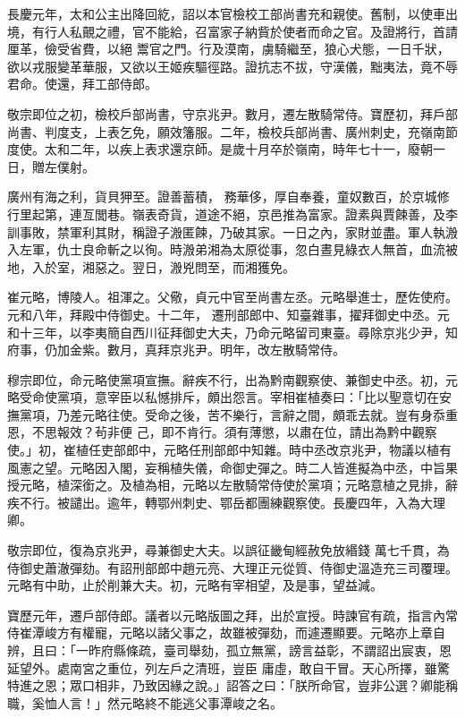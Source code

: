 \begin{pinyinscope}
 長慶元年，太和公主出降回紇，詔以本官檢校工部尚書充和親使。舊制，以使車出境，有行人私覿之禮，官不能給，召富家子納貲於使者而命之官。及證將行，首請厘革，儉受省費，以絕
 鬻官之門。行及漠南，虜騎繼至，狼心犬態，一日千狀，欲以戎服變革華服，又欲以王姬疾驅徑路。證抗志不拔，守漢儀，黜夷法，竟不辱君命。使還，拜工部侍郎。



 敬宗即位之初，檢校戶部尚書，守京兆尹。數月，遷左散騎常侍。寶歷初，拜戶部尚書、判度支，上表乞免，願效籓服。二年，檢校兵部尚書、廣州刺史，充嶺南節度使。太和二年，以疾上表求還京師。是歲十月卒於嶺南，時年七十一，廢朝一日，贈左僕射。



 廣州有海之利，貨貝狎至。證善蓄積，
 務華侈，厚自奉養，童奴數百，於京城修行里起第，連亙閭巷。嶺表奇貨，道途不絕，京邑推為富家。證素與賈餗善，及李訓事敗，禁軍利其財，稱證子溵匿餗，乃破其家。一日之內，家財並盡。軍人執溵入左軍，仇士良命斬之以徇。時溵弟湘為太原從事，忽白晝見綠衣人無首，血流被地，入於室，湘惡之。翌日，溵兇問至，而湘獲免。



 崔元略，博陵人。祖渾之。父儆，貞元中官至尚書左丞。元略舉進士，歷佐使府。元和八年，拜殿中侍御史。十二年，
 遷刑部郎中、知臺雜事，擢拜御史中丞。元和十三年，以李夷簡自西川征拜御史大夫，乃命元略留司東臺。尋除京兆少尹，知府事，仍加金紫。數月，真拜京兆尹。明年，改左散騎常侍。



 穆宗即位，命元略使黨項宣撫。辭疾不行，出為黔南觀察使、兼御史中丞。初，元略受命使黨項，意宰臣以私憾排斥，頗出怨言。宰相崔植奏曰：「比以聖意切在安撫黨項，乃差元略往使。受命之後，苦不樂行，言辭之間，頗乖去就。豈有身忝重恩，不思報效？茍非便
 己，即不肯行。須有薄懲，以肅在位，請出為黔中觀察使。」初，崔植任吏部郎中，元略任刑部郎中知雜。時中丞改京兆尹，物議以植有風憲之望。元略因入閣，妄稱植失儀，命御史彈之。時二人皆進擬為中丞，中旨果授元略，植深銜之。及植為相，元略以左散騎常侍使於黨項；元略意植之見排，辭疾不行。被譴出。逾年，轉鄂州刺史、鄂岳都團練觀察使。長慶四年，入為大理卿。



 敬宗即位，復為京兆尹，尋兼御史大夫。以誤征畿甸經赦免放緡錢
 萬七千貫，為侍御史蕭澈彈劾。有詔刑部郎中趙元亮、大理正元從質、侍御史溫造充三司覆理。元略有中助，止於削兼大夫。初，元略有宰相望，及是事，望益減。



 寶歷元年，遷戶部侍郎。議者以元略版圖之拜，出於宣授。時諫官有疏，指言內常侍崔潭峻方有權寵，元略以諸父事之，故雖被彈劾，而遽遷顯要。元略亦上章自辨，且曰：「一昨府縣條疏，臺司舉劾，孤立無黨，謗言益彰，不謂詔出宸衷，恩延望外。處南宮之重位，列左戶之清班，豈臣
 庸虛，敢自干冒。天心所擇，雖驚特進之恩；眾口相非，乃致因緣之說。」詔答之曰：「朕所命官，豈非公選？卿能稱職，奚恤人言！」然元略終不能逃父事潭峻之名。




\end{pinyinscope}
